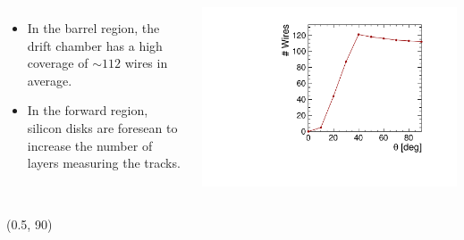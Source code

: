 \documentclass[final,xcolor={dvipsnames,svgnames,x11names,table}]{beamer}
\begin{document}
\begin{frame}
\begin{textblock}{82}
\begin{tcolorbox}[title=The drift chamber]
\begin{columns}
      \begin{itemize}
        \item In the barrel region, the drift chamber has a high coverage of $\sim 112$ wires in average.
        \item In the forward region, silicon disks are foresean to increase the number of layers measuring the tracks.
      \end{itemize}
      \centering
      \includegraphics[width=\textwidth]{Figures/numWires}
  \end{columns}

  \end{tcolorbox}
\end{textblock}


\begin{textblock}{80}(0.5, 90)
  \begin{tcolorbox}[title=Main sources of beam-induced backgrounds at the FCC-ee and the impact on the IDEA drift chamber]


\end{tcolorbox}
\end{textblock}
\end{frame}
\end{document}
